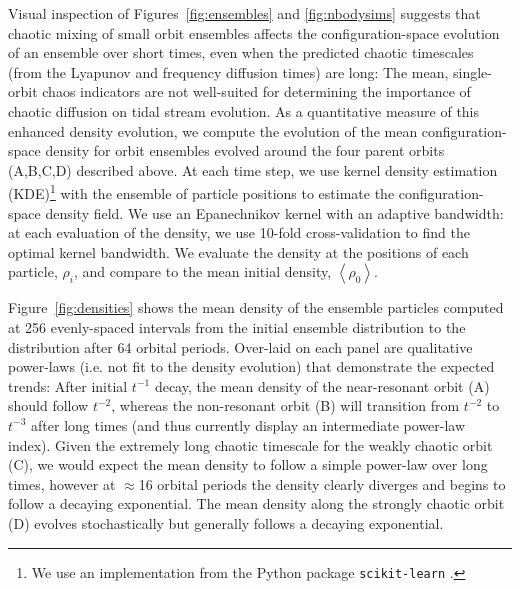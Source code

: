 \documentclass[letterpaper,12pt,preprint]{aastex}
\newcommand{\mean}[1]{\left< #1 \right>}
\begin{document}
Visual inspection of Figures~\ref{fig:ensembles} and \ref{fig:nbodysims} suggests that chaotic mixing of small orbit ensembles affects the configuration-space evolution of an ensemble over short times, even when the predicted chaotic timescales (from the Lyapunov and frequency diffusion times) are long: The mean, single-orbit chaos indicators are not well-suited for determining the importance of chaotic diffusion on tidal stream evolution. As a quantitative measure of this enhanced density evolution, we compute the evolution of the mean configuration-space density for orbit ensembles evolved around the four parent orbits (A,B,C,D) described above. At each time step, we use kernel density estimation (KDE)\footnote{We use an implementation from the Python package \texttt{scikit-learn} \citep{scikitlearn}.} with the ensemble of particle positions to estimate the configuration-space density field. We use an Epanechnikov kernel with an adaptive bandwidth: at each evaluation of the density, we use 10-fold cross-validation to find the optimal kernel bandwidth. We evaluate the density at the positions of each particle, $\rho_i$, and compare to the mean initial density, $\mean{\rho_0}$.

Figure~\ref{fig:densities} shows the mean density of the ensemble particles computed at 256 evenly-spaced intervals from the initial ensemble distribution to the distribution after 64 orbital periods. Over-laid on each panel are qualitative power-laws (i.e. not fit to the density evolution) that demonstrate the expected trends: After initial $t^{-1}$ decay, the mean density of the near-resonant orbit (A) should follow $t^{-2}$, whereas the non-resonant orbit (B) will transition from $t^{-2}$ to $t^{-3}$ after long times (and thus currently display an intermediate power-law index). Given the extremely long chaotic timescale for the weakly chaotic orbit (C), we would expect the mean density to follow a simple power-law over long times, however at $\approx$16 orbital periods the density clearly diverges and begins to follow a decaying exponential. The mean density along the strongly chaotic orbit (D) evolves stochastically but generally follows a decaying exponential.
\end{document}
